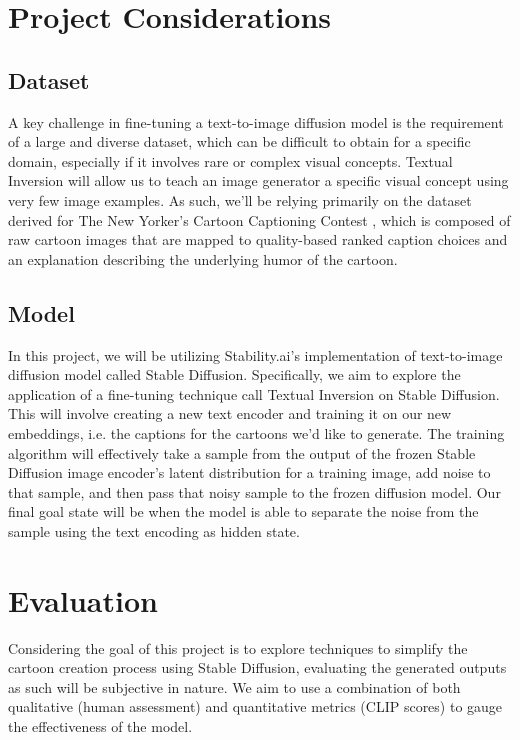 \documentclass[letterpaper]{article} %
\begin{document}
\section{Project Considerations}

\subsection{Dataset}
A key challenge in fine-tuning a text-to-image diffusion model is the requirement of a large and diverse dataset, which can be difficult to obtain for a specific domain, especially if it involves rare or complex visual concepts. Textual Inversion will allow us to teach an image generator a specific visual concept using very few image examples. As such, we’ll be relying primarily on the dataset derived for The New Yorker’s Cartoon Captioning Contest \cite{hessel2022androids}, which is composed of raw cartoon images that are mapped to quality-based ranked caption choices and an explanation describing the underlying humor of the cartoon.

\subsection{Model}

In this project, we will be utilizing Stability.ai’s implementation of text-to-image diffusion model called Stable Diffusion. Specifically, we aim to explore the application of a fine-tuning technique call Textual Inversion on Stable Diffusion. This will involve creating a new text encoder and training it on our new embeddings, i.e. the captions for the cartoons we’d like to generate. The training algorithm will effectively take a sample from the output of the frozen Stable Diffusion image encoder’s latent distribution for a training image, add noise to that sample, and then pass that noisy sample to the frozen diffusion model. Our final goal state will be when the model is able to separate the noise from the sample using the text encoding as hidden state.



\section{Evaluation}

Considering the goal of this project is to explore techniques to simplify the cartoon creation process using Stable Diffusion, evaluating the generated outputs as such will be subjective in nature. We aim to use a combination of both qualitative (human assessment) and quantitative metrics (CLIP scores) to gauge the effectiveness of the model.


\end{document}
